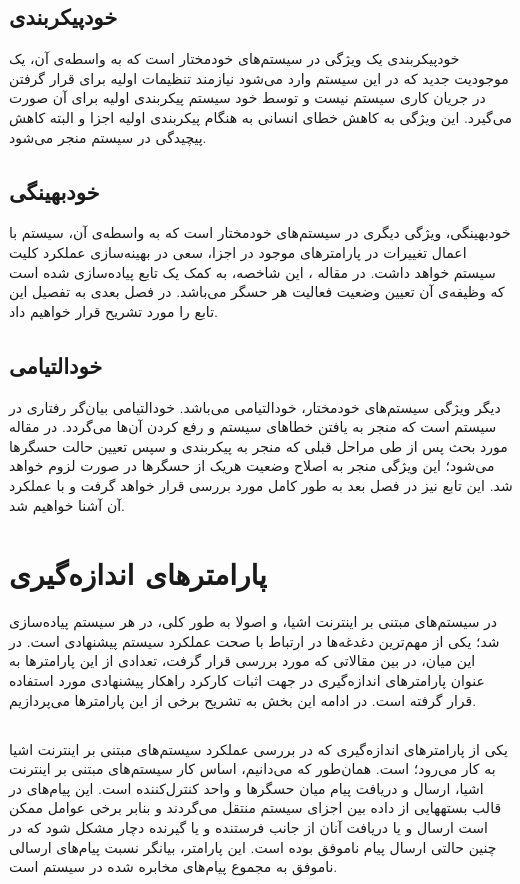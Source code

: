 \subsection{خودپیکربندی}
خودپیکربندی یک ویژگی در سیستم‌های خودمختار است که به واسطه‌ی آن، یک موجودیت جدید که در این سیستم وارد می‌شود نیازمند تنظیمات اولیه برای قرار گرفتن در جریان کاری سیستم نیست و توسط خود سیستم پیکربندی اولیه برای آن صورت می‌گیرد. این ویژگی به کاهش خطای انسانی به هنگام پیکربندی اولیه اجزا و البته کاهش پیچیدگی در سیستم منجر می‌شود.

\subsection{خودبهینگی}
خودبهینگی، ویژگی دیگری در سیستم‌های خودمختار است که به واسطه‌ی آن، سیستم با اعمال تغییرات در پارامترهای موجود در اجزا، سعی در بهینه‌سازی عملکرد کلیت سیستم خواهد داشت. در مقاله \cite{}، این شاخصه، به کمک یک تابع پیاده‌سازی شده است که وظیفه‌ی آن تعیین وضعیت فعالیت هر حسگر می‌باشد. در فصل بعدی به تفصیل این تابع را مورد تشریح قرار خواهیم داد.

\subsection{خودالتیامی}
دیگر ویژگی سیستم‌های خودمختار، خودالتیامی می‌باشد. خودالتیامی بیان‌گر رفتاری در سیستم است که منجر به یافتن خطاهای سیستم و رفع کردن آن‌ها می‌گردد. در مقاله مورد بحث پس از طی مراحل قبلی که منجر به پیکربندی و سپس تعیین حالت حسگرها می‌شود؛ این ویژگی منجر به اصلاح وضعیت هریک از حسگرها در صورت لزوم خواهد شد. این تابع نیز در فصل بعد به طور کامل مورد بررسی قرار خواهد گرفت و با عملکرد آن آشنا خواهیم شد.

\section{پارامترهای اندازه‌گیری}
در سیستم‌های مبتنی بر اینترنت اشیا، و اصولا به طور کلی، در هر سیستم پیاده‌سازی شد؛ یکی از مهم‌ترین دغدغه‌ها در ارتباط با صحت عملکرد سیستم پیشنهادی است. در این میان، در بین مقالاتی که مورد بررسی قرار گرفت، تعدادی از این پارامترها به عنوان پارامتر‌های اندازه‌گیری در جهت اثبات کارکرد راهکار پیشنهادی مورد استفاده قرار گرفته است. در ادامه این بخش به تشریح برخی از این پارامترها می‌پردازیم.

\subsection{}
یکی از پارامتر‌های اندازه‌گیری که در بررسی عملکرد سیستم‌های مبتنی بر اینترنت اشیا به کار می‌رود؛  است. همان‌طور که می‌دانیم، اساس کار سیستم‌های مبتنی بر اینترنت اشیا، ارسال و دریافت پیام میان حسگرها و واحد کنترل‌کننده است. این پیام‌های در قالب بستههایی از داده بین اجزای سیستم منتقل می‌گردند و بنابر برخی عوامل ممکن است ارسال و یا دریافت آنان از جانب فرستنده و یا گیرنده دچار مشکل شود که در چنین حالتی ارسال پیام ناموفق بوده است. این پارامتر، بیانگر نسبت پیام‌های ارسالی ناموفق به مجموع پیام‌های مخابره شده در سیستم است.

